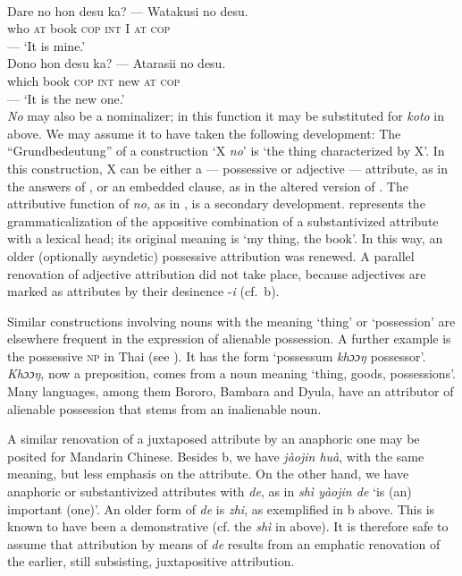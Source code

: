 \ea\label{ex:E40}
\langinfo{\LangJap}{}{} \\
 \ea
 \gll Dare  no  hon  desu  ka?  ---  Watakusi  no  desu.\\
  who  \textsc{at}  book  \textsc{cop}  \textsc{int}  {}  I  \textsc{at}  \textsc{cop}\\
 ---  {‘It is mine.’}\\
\ex
\gll  Dono  hon  desu  ka?  ---  Atarasii  no  desu.\\
 which  book \textsc{cop}  \textsc{int}  {} new  \textsc{at}  \textsc{cop}\\
 --- {‘It is the new one.’}\\
\z
\z 
\noindent\label{page74b}\textit{No} may also be a nominalizer; in this function it may be substituted for \textit{koto} in  above. We may assume it to have taken the following development: The ``Grundbedeutung'' of a construction ‘X \textit{no}’ is ‘the thing characterized by X’. In this construction, X can be either a — possessive or adjective — attribute, as in the answers of , or an embedded clause, as in the altered version of . The attributive function of \textit{no}, as in , is a secondary development.  represents the grammaticalization of the appositive combination of a substantivized attribute with a lexical head; its original meaning is ‘my thing, the book’. In this way, an older (optionally asyndetic) possessive attribution was renewed. A parallel renovation of adjective attribution did not take place, because adjectives are marked as attributes by their desinence -\textit{i} (cf.~b).

\label{page75}Similar constructions involving nouns with the meaning ‘thing’ or ‘possession’ are elsewhere frequent in the expression of alienable possession. A further example is the possessive \textsc{np} in Thai (see \citealt[389]{MallinsonEtAl1981}). It has the form ‘possessum \textit{khɔɔŋ} possessor’. \textit{Khɔɔŋ}, now a preposition, comes from a noun meaning ‘thing, goods, possessions’. Many languages, among them Bororo, Bambara and Dyula, have an attributor of alienable possession that stems from an inalienable noun.

A similar renovation of a juxtaposed attribute by an anaphoric one may be posited for Mandarin Chinese. Besides b, we have \textit{jàojin huà}, with the same meaning, but less emphasis on the attribute. On the other hand, we have anaphoric or substantivized attributes with \textit{de}, as in \textit{shì yàojin de} ‘is (an) important (one)’. An older form of \textit{de} is \textit{zhi}, as exemplified in b above. This is known to have been a demonstrative (cf. the \textit{shì} in  above). It is therefore safe to assume that attribution by means of \textit{de} results from an emphatic renovation of the earlier, still subsisting, juxtapositive attribution.


